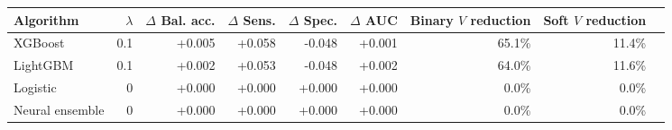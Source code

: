 \begin{tabular}{lrrrrrrrr}
\toprule
Algorithm & $\lambda$ & $\Delta$ Bal. acc. & $\Delta$ Sens. & $\Delta$ Spec. & $\Delta$ AUC & Binary $V$ reduction & Soft $V$ reduction \\
\midrule
XGBoost & 0.1 & +0.005 & +0.058 & -0.048 & +0.001 & 65.1\% & 11.4\% \\
LightGBM & 0.1 & +0.002 & +0.053 & -0.048 & +0.002 & 64.0\% & 11.6\% \\
Logistic & 0 & +0.000 & +0.000 & +0.000 & +0.000 & 0.0\% & 0.0\% \\
Neural ensemble & 0 & +0.000 & +0.000 & +0.000 & +0.000 & 0.0\% & 0.0\% \\
\bottomrule
\end{tabular}
